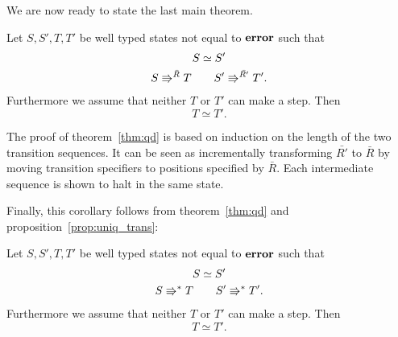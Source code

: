 We are now ready to state the last main theorem.

\begin{theorem} \label{thm:qd}
  Let $S, S', T, T'$ be well typed states not equal to $\mbox{{\bf error}}$ such that
  \begin{equation*}
    \begin{gathered}
      S \simeq S' \\
      S \Rrightarrow^{\bar{R}} T \quad\quad S' \Rrightarrow^{\bar{R'}} T'.
    \end{gathered}
  \end{equation*}
  Furthermore we assume that neither $T$ or $T'$ can make a step.
  Then
  \begin{equation*}
    T \simeq T'.
  \end{equation*}
\end{theorem}

The proof of theorem~\ref{thm:qd} is based on induction on the length of the two
transition sequences. It can be seen as incrementally transforming $\bar{R'}$ to
$\bar{R}$ by moving transition specifiers to positions specified by $\bar{R}$.
Each intermediate sequence is shown to halt in the same state.

Finally, this corollary follows from theorem~\ref{thm:qd} and
proposition~\ref{prop:uniq_trans}:
\begin{corollary}
  Let $S, S', T, T'$ be well typed states not equal to $\mbox{{\bf error}}$ such that
  \begin{equation*}
    \begin{gathered}
      S \simeq S' \\
      S \Rrightarrow^* T \quad\quad S' \Rrightarrow^* T'.
    \end{gathered}
  \end{equation*}
  Furthermore we assume that neither $T$ or $T'$ can make a step.
  Then
  \begin{equation*}
    T \simeq T'.
  \end{equation*}
\end{corollary}

